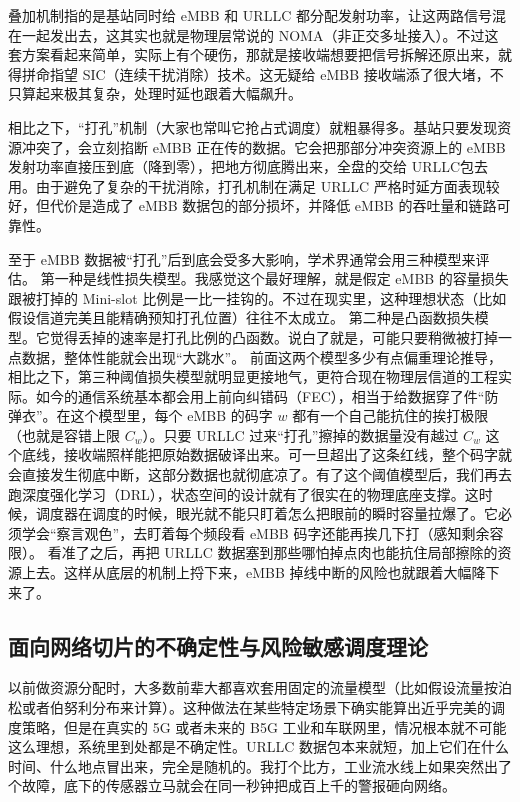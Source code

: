 叠加机制指的是基站同时给 eMBB 和 URLLC 都分配发射功率，让这两路信号混在一起发出去，这其实也就是物理层常说的 NOMA（非正交多址接入）。不过这套方案看起来简单，实际上有个硬伤，那就是接收端想要把信号拆解还原出来，就得拼命指望 SIC（连续干扰消除）技术。这无疑给 eMBB 接收端添了很大堵，不只算起来极其复杂，处理时延也跟着大幅飙升。

相比之下，“打孔”机制（大家也常叫它抢占式调度）就粗暴得多。基站只要发现资源冲突了，会立刻掐断 eMBB 正在传的数据。它会把那部分冲突资源上的 eMBB 发射功率直接压到底（降到零），把地方彻底腾出来，全盘的交给 URLLC包去用。由于避免了复杂的干扰消除，打孔机制在满足 URLLC 严格时延方面表现较好，但代价是造成了 eMBB 数据包的部分损坏，并降低 eMBB 的吞吐量和链路可靠性。

至于 eMBB 数据被“打孔”后到底会受多大影响，学术界通常会用三种模型来评估。
第一种是线性损失模型。我感觉这个最好理解，就是假定 eMBB 的容量损失跟被打掉的 Mini-slot 比例是一比一挂钩的。不过在现实里，这种理想状态（比如假设信道完美且能精确预知打孔位置）往往不太成立。
第二种是凸函数损失模型。它觉得丢掉的速率是打孔比例的凸函数。说白了就是，可能只要稍微被打掉一点数据，整体性能就会出现“大跳水”。
前面这两个模型多少有点偏重理论推导，相比之下，第三种阈值损失模型就明显更接地气，更符合现在物理层信道的工程实际。如今的通信系统基本都会用上前向纠错码（FEC），相当于给数据穿了件“防弹衣”。在这个模型里，每个 eMBB 的码字 $w$ 都有一个自己能抗住的挨打极限（也就是容错上限 $C_w$）。只要 URLLC 过来“打孔”擦掉的数据量没有越过 $C_w$ 这个底线，接收端照样能把原始数据破译出来。可一旦超出了这条红线，整个码字就会直接发生彻底中断，这部分数据也就彻底凉了。有了这个阈值模型后，我们再去跑深度强化学习（DRL），状态空间的设计就有了很实在的物理底座支撑。这时候，调度器在调度的时候，眼光就不能只盯着怎么把眼前的瞬时容量拉爆了。它必须学会“察言观色”，去盯着每个频段看 eMBB 码字还能再挨几下打（感知剩余容限）。
看准了之后，再把 URLLC 数据塞到那些哪怕掉点肉也能抗住局部擦除的资源上去。这样从底层的机制上捋下来，eMBB 掉线中断的风险也就跟着大幅降下来了。


\subsection{面向网络切片的不确定性与风险敏感调度理论}\label{213-ux9762ux5411ux672aux77e5ux5230ux8fbeux7387ux7684ux9c81ux68d2ux6027ux6d4bux8bd5ux4e0eux98ceux9669ux538cux6076风险规避ux6253ux5b54ux6269ux5c55}


以前做资源分配时，大多数前辈大都喜欢套用固定的流量模型（比如假设流量按泊松或者伯努利分布来计算）。这种做法在某些特定场景下确实能算出近乎完美的调度策略，但是在真实的 5G 或者未来的 B5G 工业和车联网里，情况根本就不可能这么理想，系统里到处都是不确定性。URLLC 数据包本来就短，加上它们在什么时间、什么地点冒出来，完全是随机的。我打个比方，工业流水线上如果突然出了个故障，底下的传感器立马就会在同一秒钟把成百上千的警报砸向网络。

